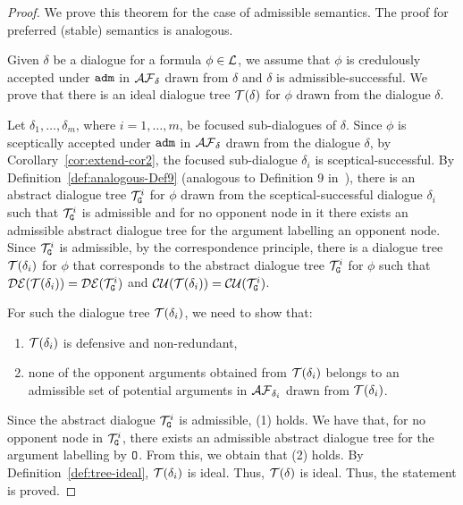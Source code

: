 \begin{proof} We prove this theorem for the case of admissible semantics. The proof for preferred (stable) semantics is analogous.

Given $\delta$ be a dialogue for a formula $\phi \in \mathcal{L}$, we assume that $\phi$ is credulously accepted under $\texttt{\textup{adm}}$ in $\mathcal{AF}_{\delta}$ drawn from $\delta$ and $\delta$ is admissible-successful. 
We prove that there is an ideal dialogue tree $\mathcal{T}(\delta)$ for $\phi$ drawn from the dialogue $\delta$.

Let $\delta_1, \ldots, \delta_m$, where $i = 1, \ldots, m$,  be focused sub-dialogues of $\delta$.
%
Since $\phi$ is sceptically accepted under $\texttt{\textup{adm}}$ in $\mathcal{AF}_{\delta}$ drawn from the dialogue $\delta$, by Corollary~\ref{cor:extend-cor2}, the focused sub-dialogue $\delta_{i}$ is sceptical-successful.
By Definition~\ref{def:analogous-Def9} (analogous to Definition 9 in~\cite{loanho_2024}), there is an abstract dialogue tree $\mathcal{T}^{i}_{\texttt{\textup{G}}}$ for $\phi$ drawn from the sceptical-successful dialogue $\delta_i$ such that $\mathcal{T}^{i}_{\texttt{\textup{G}}}$ is admissible and for no opponent node in it there exists an admissible abstract dialogue tree for the argument labelling an opponent node.
%
Since $\mathcal{T}^{i}_{\texttt{\textup{G}}}$ is admissible, by the correspondence principle, there is a dialogue tree $\mathcal{T}(\delta_i)$ for $\phi$ that corresponds to the abstract dialogue tree $\mathcal{T}_{\texttt{\textup{G}}}^{i}$ for $\phi$ such that  $\mathcal{DE}(\mathcal{T}(\delta_i)) = \mathcal{DE}(\mathcal{T}_{\texttt{\textup{G}}}^{i})$ and $\mathcal{CU}(\mathcal{T}(\delta_ i)) = \mathcal{CU}(\mathcal{T}_{\texttt{\textup{G}}}^{i})$.

For such the dialogue tree $\mathcal{T}(\delta_i)$, we need to show that:
\begin{enumerate}
    \item $\mathcal{T}(\delta_i)$ is defensive and non-redundant,
    \item none of the opponent arguments obtained from $\mathcal{T}(\delta_i)$ belongs to an admissible set of potential arguments in $\mathcal{AF}_{\delta_i}$ drawn from $\mathcal{T}(\delta_i)$.
\end{enumerate}


Since the abstract dialogue $\mathcal{T}_{\texttt{\textup{G}}}^{i}$ is admissible, (1) holds. 
We have that, for no opponent node in $\mathcal{T}_{\texttt{\textup{G}}}^{i}$, there exists an admissible abstract dialogue tree for the argument labelling by $\texttt{\textup{O}}$. From this, we obtain that (2) holds.
By Definition~\ref{def:tree-ideal}, $\mathcal{T}(\delta_i)$ is ideal. Thus, $\mathcal{T}(\delta)$ is ideal. Thus, the statement is proved.


\end{proof}
